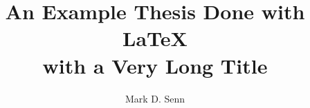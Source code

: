 \documentclass[ece,dissertation]{puthesis}
\title{An Example Thesis Done with LaTeX\\
  with a Very Long Title}
\author{Mark D. Senn}{Senn, Mark D.}
\begin{document}
\volume












\appendices









\end{document}
